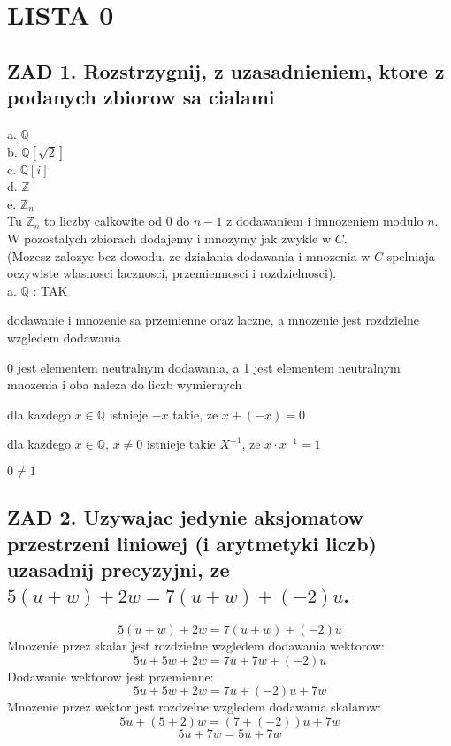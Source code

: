 \documentclass{article}
\newcommand{\Q}{\mathbb{Q}}
\newcommand{\Z}{\mathbb{Z}}
\begin{document}
\pagecolor{back}\color{txt}\ttfamily
\section*{\color{tit}LISTA 0}
\subsection*{\color{tit}ZAD 1. \color{txt}Rozstrzygnij, z uzasadnieniem, ktore z podanych zbiorow sa cialami}
  \color{def}a. \color{txt}$\Q$\smallskip\\
  \color{def}b. \color{txt}$\Q[\sqrt{2}]$\smallskip\\
  \color{def}c. \color{txt}$\Q[i]$\smallskip\\
  \color{def}d. \color{txt}$\Z$\smallskip\\
  \color{def}e. \color{txt}$\Z_n$\smallskip\\
  Tu $\Z_n$ to liczby calkowite od 0 do $n-1$ z dodawaniem i imnozeniem modulo $n$. W pozostalych zbiorach dodajemy i mnozymy jak zwykle w $C$.\\
  (Mozesz zalozyc bez dowodu, ze dzialania dodawania i mnozenia w $C$ spelniaja oczywiste wlasnosci lacznosci, przemiennosci i rozdzielnosci).\medskip\\
  a. $\Q$ : TAK\smallskip\par
    dodawanie i mnozenie sa przemienne oraz laczne, a mnozenie jest rozdzielne wzgledem dodawania\smallskip\par
    0 jest elementem neutralnym dodawania, a 1 jest elementem neutralnym mnozenia i oba naleza do liczb wymiernych\smallskip\par
    dla kazdego $x\in\Q$ istnieje $-x$ takie, ze $x+(-x)=0$\smallskip\par
    dla kazdego $x\in\Q$, $x\neq0$ istnieje takie $X^{-1}$, ze $x\cdot x^{-1}=1$\smallskip\par
    $0\neq1$
\subsection*{\color{tit}ZAD 2. \color{txt}Uzywajac jedynie aksjomatow przestrzeni liniowej (i arytmetyki liczb) uzasadnij precyzyjni, ze $5(u+w)+2w=7(u+w)+(-2)u$.}
  $$5(u+w)+2w=7(u+w)+(-2)u$$
  Mnozenie przez skalar jest rozdzielne wzgledem dodawania wektorow:
  $$5u+5w+2w=7u+7w+(-2)u$$
  Dodawanie wektorow jest przemienne:
  $$5u+5w+2w=7u+(-2)u+7w$$
  Mnozenie przez wektor jest rozdzelne wzgledem dodawania skalarow:
  $$5u+(5+2)w=(7+(-2))u+7w$$
  $$5u+7w=5u+7w$$
\end{document}
